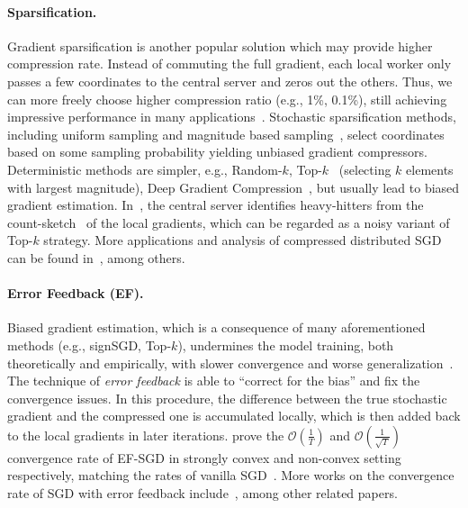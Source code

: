 \documentclass[11pt]{article}
\begin{document}
\paragraph{Sparsification.} Gradient sparsification is another popular solution which may provide higher compression rate. Instead of commuting the full gradient, each local worker only passes a few coordinates to the central server and zeros out the others. Thus, we can more freely choose higher compression ratio (e.g., 1\%, 0.1\%), still achieving impressive performance in many applications~\cite{Proc:Lin_ICLR18}. Stochastic sparsification methods, including uniform sampling and magnitude based sampling~\cite{wangni2018gradient}, select coordinates based on some sampling probability yielding unbiased gradient compressors. Deterministic methods are simpler, e.g., Random-$k$, Top-$k$~\cite{stich2018sparsified,shi2019convergence} (selecting $k$ elements with largest magnitude), Deep Gradient Compression~\cite{Proc:Lin_ICLR18}, but usually lead to biased gradient estimation. In~\cite{Proc:Ivkin_NIPS19}, the central server identifies heavy-hitters from the count-sketch~\cite{Proc:Charikar_ICALP02} of the local gradients, which can be regarded as a noisy variant of Top-$k$ strategy. More applications and analysis of compressed distributed SGD can be found in~\cite{jiang2018linear,Proc:Shen_ICML18,alistarh2018convergence,Proc:Basu_NIPS19,Proc:Jiang_SIGMOD18}, among others.

\paragraph{Error Feedback (EF).} Biased gradient estimation, which is a consequence of many aforementioned methods (e.g., signSGD, Top-$k$), undermines the model training, both theoretically and empirically, with slower convergence and worse generalization~\cite{ajalloeian2020analysis,Arxiv:Beznosikov20}. The technique of \textit{error feedback} is able to ``correct for the bias'' and fix the convergence issues. 
In this procedure, the difference between the true stochastic gradient and the compressed one is accumulated locally, which is then added back to the local gradients in later iterations. \cite{stich2018sparsified,karimireddy2019error} prove the $\mathcal O(\frac{1}{T})$ and $\mathcal O(\frac{1}{\sqrt T})$ convergence rate of EF-SGD in strongly convex and non-convex setting respectively, matching the rates of vanilla SGD~\cite{nemirovski2009robust,ghadimi2013stochastic}. More works on the convergence rate of SGD with error feedback include~\cite{Proc:Zheng_NIPS19,Article:Stich_arxiv19}, among other related papers.
\end{document}
